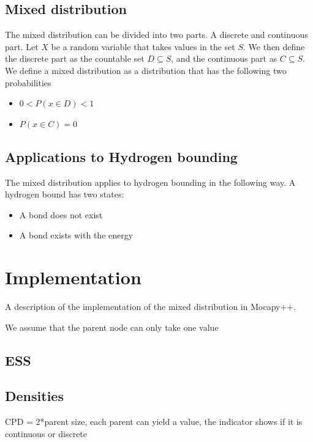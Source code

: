 \documentclass[10pt, conference, compsocconf,a4paper]{IEEEtran}
\begin{document}
\subsection{Mixed distribution} %
\label{sub:mixed_distribution}
The mixed distribution can be divided into two parts. A discrete and continuous part. Let $X$ be a random variable that takes values in the set $S$. We then define the discrete part as the countable set $D \subseteq S$, and the continuous part as $C \subseteq S$. We define a mixed distribution as a distribution that has the following two probabilities

\begin{itemize}
  \item $0 < P(x \in D) < 1$
  \item $P(x \in C) = 0$
\end{itemize} 

\subsection{Applications to Hydrogen bounding} %
\label{sub:applications_to_hydrogen_bounding}
The mixed distribution applies to hydrogen bounding in the following way. A hydrogen bound has two states:

\begin{itemize}
  \item A bond does not exist
  \item A bond exists with the energy 
\end{itemize}





\section{Implementation} %
\label{sec:implementation}
A description of the implementation of the mixed distribution in Mocapy++. 

We assume that the parent node can only take one value

\subsection{ESS} %
\label{sub:ess}


\subsection{Densities} %
\label{sub:densities}
CPD = 2*parent size, each parent can yield a value, the indicator shows if it is continuous or discrete
\end{document}
